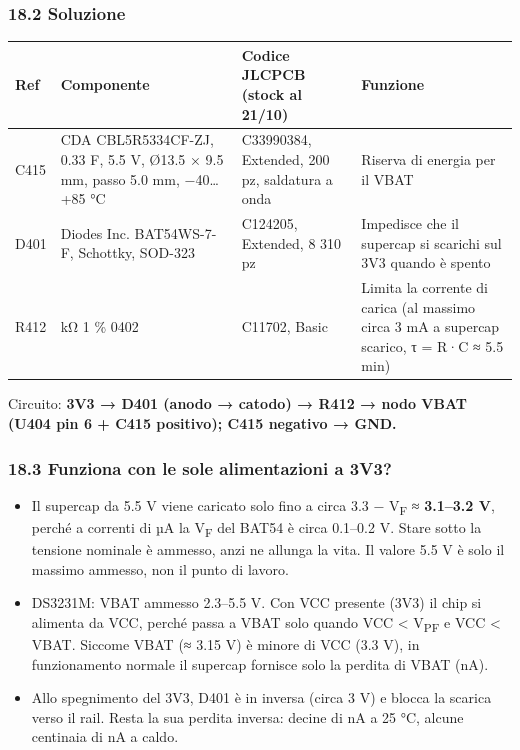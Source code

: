 \subsubsection[18.2 Soluzione]{18.2 Soluzione}

{\footnotesize{}\setlength{\tabcolsep}{4pt}\renewcommand{\arraystretch}{1.1}
\begin{longtable}{>{\raggedright\arraybackslash}p{}>{\raggedright\arraybackslash}p{}>{\raggedright\arraybackslash}p{}>{\raggedright\arraybackslash}p{}}
\toprule
\textbf{Ref} & \textbf{Componente} & \textbf{Codice JLCPCB (stock al 21/\allowbreak{}10)} & \textbf{Funzione} \\
\midrule
\endhead
\bottomrule\endfoot
C415 & CDA CBL5R5334CF-ZJ, 0.33 F, 5.5 V, Ø13.5 × 9.5 mm, passo 5.0 mm, −40…+85 °C & C33990384, Extended, 200 pz, saldatura a onda & Riserva di energia per il VBAT \\\midrule[0.15pt]
D401 & Diodes Inc. BAT54WS-7-F, Schottky, SOD-323 & C124205, Extended, 8 310 pz & Impedisce che il supercap si scarichi sul 3V3 quando è spento \\\midrule[0.15pt]
R412 & 1 kΩ 1 \% 0402 & C11702, Basic & Limita la corrente di carica (al massimo circa 3 mA a supercap scarico, τ = R·C ≈ 5.5 min) \\
\end{longtable}}

Circuito: \textbf{3V3 → D401 (anodo → catodo) → R412 → nodo VBAT (U404 pin 6 + C415 positivo); C415 negativo → GND.}

\subsubsection[18.3 Funziona con le sole alimentazioni a 3V3?]{18.3 Funziona con le sole alimentazioni a 3V3?}

\begin{itemize}
\item Il supercap da 5.5 V viene caricato solo fino a circa 3.3 − V\textsubscript{F} ≈ \textbf{3.1–3.2 V}, perché a correnti di µA la V\textsubscript{F} del BAT54 è circa 0.1–0.2 V. Stare sotto la tensione nominale è ammesso, anzi ne allunga la vita. Il valore 5.5 V è solo il massimo ammesso, non il punto di lavoro.
\item DS3231M: VBAT ammesso 2.3–5.5 V. Con VCC presente (3V3) il chip si alimenta da VCC, perché passa a VBAT solo quando VCC < V\textsubscript{PF} e VCC < VBAT. Siccome VBAT (≈ 3.15 V) è minore di VCC (3.3 V), in funzionamento normale il supercap fornisce solo la perdita di VBAT (nA).
\item Allo spegnimento del 3V3, D401 è in inversa (circa 3 V) e blocca la scarica verso il rail. Resta la sua perdita inversa: decine di nA a 25 °C, alcune centinaia di nA a caldo.
\end{itemize}

